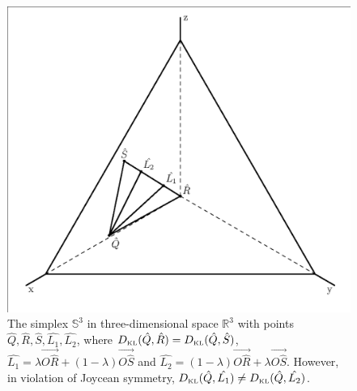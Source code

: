 \documentclass[11pt]{article}
\begin{document}
\begin{figure}[ht]
  \begin{flushright}
    \begin{minipage}[h]{.7\linewidth}
      \includegraphics[width=\textwidth]{symmetryrj.eps}
      \caption{\footnotesize The simplex $\mathbb{S}^{3}$ in
        three-dimensional space $\mathbb{R}^{3}$ with points
        $\hat{Q},\hat{R},\hat{S},\hat{L_{1}},\hat{L_{2}}$, where
        $D_{\mbox{\tiny KL}}(\hat{Q},\hat{R})=D_{\mbox{\tiny
            KL}}(\hat{Q},\hat{S})$,
        $\hat{L_{1}}=\lambda\Vec{O\hat{R}}+(1-\lambda)\Vec{O\hat{S}}$
        and
        $\hat{L_{2}}=(1-\lambda)\Vec{O\hat{R}}+\lambda\Vec{O\hat{S}}$.
        However, in violation of Joycean symmetry, $D_{\mbox{\tiny
            KL}}(\hat{Q},\hat{L_{1}})\neq{}D_{\mbox{\tiny
            KL}}(\hat{Q},\hat{L_{2}})$.}
      \label{fig:symmetryrj}
    \end{minipage}
  \end{flushright}
\end{figure}
\end{document}
